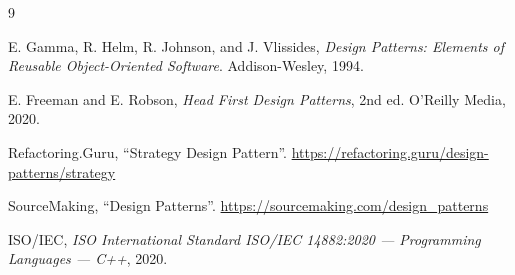 \documentclass[11pt,a4paper]{report}
\begin{document}
\begin{thebibliography}{9}

E. Gamma, R. Helm, R. Johnson, and J. Vlissides,
\emph{Design Patterns: Elements of Reusable Object-Oriented Software}.
Addison-Wesley, 1994.

E. Freeman and E. Robson,
\emph{Head First Design Patterns}, 2nd ed.
O'Reilly Media, 2020.

Refactoring.Guru, ``Strategy Design Pattern''.\newline
\url{https://refactoring.guru/design-patterns/strategy}

SourceMaking, ``Design Patterns''.\newline
\url{https://sourcemaking.com/design_patterns}

ISO/IEC, \emph{ISO International Standard ISO/IEC 14882:2020 --- Programming
Languages --- C++}, 2020.

\end{thebibliography}
\end{document}
